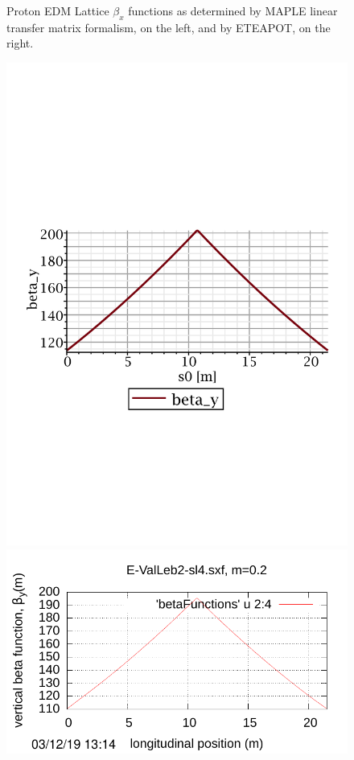 \documentclass[12]{article}
\begin{document}
\begin{figure}[hbt]
\begin{minipage}{0.5\linewidth}
\end{minipage}
\caption{\label{WollnikVsETEAPOT-x}Proton EDM Lattice $\beta_x$ functions as determined by
MAPLE linear transfer matrix formalism, on the left, and by ETEAPOT, on the right.}
\end{figure}

\begin{figure}[hbt]
\begin{minipage}{0.5\linewidth}
\centering
\includegraphics[scale=0.4]{pdf/MAPLE-betay_1cell.pdf}
\end{minipage}
\begin{minipage}{0.5\linewidth}
\centering
\includegraphics[scale=0.7]{pdf/BM-IV_Figure2r.pdf}

\end{minipage}
\end{figure}
\end{document}
